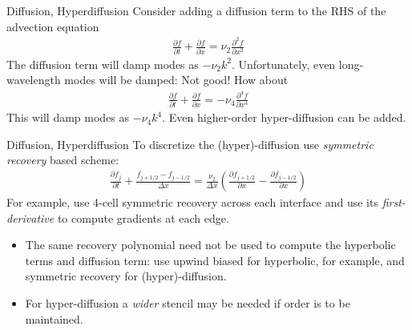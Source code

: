 \documentclass[aspectratio=169]{beamer}
\newcommand{\mypause}{\pause}
\newcommand{\pfrac}[2]{\frac{\partial #1}{\partial #2}}
\begin{document}
\begin{frame}{Diffusion, Hyperdiffusion}
  Consider adding a diffusion term to the RHS of the advection
  equation
  \begin{align*}
    \pfrac{f}{t} + \pfrac{f}{x} = \nu_2\frac{\partial^2 f}{\partial x^2}
  \end{align*}
  The diffusion term will damp modes as $-\nu_2 k^2$. Unfortunately,
  even long-wavelength modes will be damped: Not good!
  \mypause%
  How about
  \begin{align*}
    \pfrac{f}{t} + \pfrac{f}{x} = -\nu_4\frac{\partial^4 f}{\partial x^4}
  \end{align*}
  This will damp modes as $-\nu_4 k^4$. Even higher-order
  hyper-diffusion can be added.
\end{frame}

\begin{frame}{Diffusion, Hyperdiffusion}
  To discretize the (hyper)-diffusion use \emph{symmetric recovery}
  based scheme:
  \begin{align*}
    \pfrac{f_j}{t} + \frac{f_{j+1/2}-f_{j-1/2}}{\Delta x}
    =
    \frac{\nu_2}{\Delta x}
    \left(
    \pfrac{f_{j+1/2}}{x} - \pfrac{f_{j-1/2}}{x}
    \right)
  \end{align*}
  For example, use 4-cell symmetric recovery across each interface and
  use its \emph{first-derivative} to compute gradients at each edge.
  \mypause%
  \begin{itemize}
  \item The same recovery polynomial need not be used to compute the
    hyperbolic terms and diffusion term: use upwind biased for
    hyperbolic, for example, and symmetric recovery for
    (hyper)-diffusion.
  \item For hyper-diffusion a \emph{wider} stencil may be needed if
    order is to be maintained.
  \end{itemize}
\end{frame}  
\end{document}

